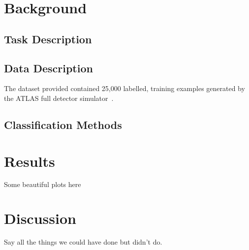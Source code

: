 \documentclass[10pt,conference,compsocconf]{IEEEtran}
\begin{document}
\section{Background}
\subsection{Task Description}

\subsection{Data Description}
The dataset provided contained 25,000 labelled, training examples generated by the ATLAS full detector simulator~\cite{}.

\subsection{Classification Methods}

\section{Results}
Some beautiful plots here

\section{Discussion}
Say all the things we could have done but didn't do.



\end{document}
